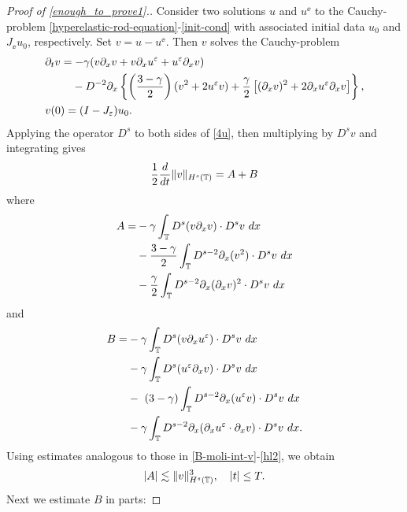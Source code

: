\begin{proof}[Proof of \eqref{enough_to_prove1}.]
Consider two solutions $u $ and $u^\ee$ to the Cauchy-problem
\eqref{hyperelastic-rod-equation}-\eqref{init-cond}
with associated initial data $u_0$ and
$J_\ee u_0$, respectively. Set $v= u -u^\ee $. Then $v$ solves the
Cauchy-problem
\begin{align}
\label{4u}
& \p_t v  =  - \gamma (v \p_x v + v \p_x u^\ee + u^\ee \p_x v)  \\
& \phantom{\p_t v  =} - D^{-2} \p_x \left\{ \left (\frac{3-\gamma}{2} \right )(v^2 +
2u^\ee v) + \frac{\gamma}{2}\left[ (\p_x v)^2 + 2 \p_x u^\ee \p_x v \right]
\right\}, \notag
\\
& v(0) = (I- J_\ee)u_0.
\label{5u}
\end{align}
Applying the operator $D^s$ to both sides of \eqref{4u}, then multiplying by
$D^s v$ and integrating gives
%
%
\begin{equation}
\begin{split}
\frac{1}{2}\frac{d}{dt} \|v\|_{H^s(\mathbb{T})} = A + B
\label{6u}
\end{split}
\end{equation}
%
%
where
%
%
\begin{equation}
\begin{split}
A
 =  & -\gamma \int_{\mathbb{T}} D^s(v \partial_x v) \cdot D^s v \
dx
\\
& - \frac{3- \gamma}{2} \int_{\mathbb{T}} D^{s-2} \partial_x (v^2) \cdot D^s v
\ dx
\\
& - \frac{\gamma}{2}\int_{\mathbb{T}} D^{s-2} \partial_x (\partial_x v)^2 \cdot D^s
v \ dx
\label{7u}
\end{split}
\end{equation}
%
%
and
%
%
\begin{equation}
\begin{split}
B = & -\gamma \int_{\mathbb{T}} D^s (v \partial_x u^\varepsilon ) \cdot D^s v \
dx \\
& -\gamma \int_{\mathbb{T}} D^s (u^\varepsilon \partial_x v) \cdot D^s v \
dx
\\
& - \ ( 3- \gamma) \int_{\mathbb{T}} D^{s-2} \partial_x (u^\varepsilon v) \cdot D^s
v \ dx
\\
& -\gamma \int_{\mathbb{T}} D^{s-2} \partial_x
(\partial_x u^\varepsilon \cdot \partial_x v) \cdot D^s v \
dx.
\label{8u}
\end{split}
\end{equation}
%
%
Using estimates analogous to those in 
\eqref{B-moli-int-v}-\eqref{hl2}, we 
obtain 
%
%
\begin{equation}
\begin{split}
|A| \lesssim \|v\|_{H^s(\mathbb{T})}^3, \quad |t| \le T.
\label{8'u}
\end{split}
\end{equation}
%
%
%
Next we estimate $B$ in parts:
%
%
%
%
%


\end{proof}
